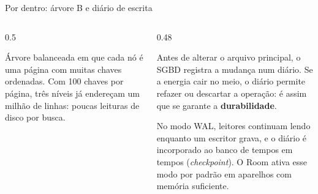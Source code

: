 \documentclass[aspectratio=169,10pt]{beamer}
\begin{document}
\begin{frame}{Por dentro: árvore B e diário de escrita}
  \begin{columns}[c]
    \begin{column}{0.5\textwidth}
      \centering
      \begin{definicao}[Árvore B]
        Árvore balanceada em que cada nó é uma página com muitas chaves ordenadas. Com 100 chaves por página, três níveis já endereçam um milhão de linhas: poucas leituras de disco por busca.
      \end{definicao}
    \end{column}
    \begin{column}{0.48\textwidth}
      \begin{definicao}
        Antes de alterar o arquivo principal, o SGBD registra a mudança num diário. Se a energia cair no meio, o diário permite refazer ou descartar a operação: é assim que se garante a \textbf{durabilidade}.
      \end{definicao}
      \begin{pordentro}
        No modo WAL, leitores continuam lendo enquanto um escritor grava, e o diário é incorporado ao banco de tempos em tempos (\emph{checkpoint}). O Room ativa esse modo por padrão em aparelhos com memória suficiente.
      \end{pordentro}
    \end{column}
  \end{columns}
\end{frame}
\end{document}
